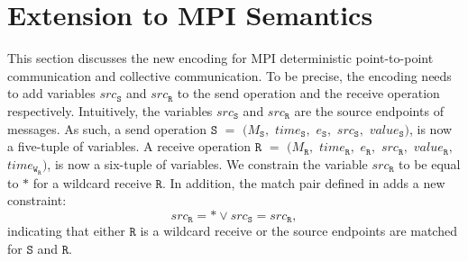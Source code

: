 \section{Extension to MPI Semantics}
This section discusses the new encoding for MPI deterministic point-to-point communication and collective communication. To be precise, the encoding needs to add variables  $src_\mathtt{S}$ and $src_\mathtt{R}$ to the send operation and the receive operation respectively. Intuitively, the variables $src_\mathtt{S}$ and $src_\mathtt{R}$ are the source endpoints of messages. As such, a send operation $\mathtt{S}$ $=$ $(M_\mathtt{S},$ $\mathit{time}_\mathtt{S},$ $e_\mathtt{S},$ $src_\mathtt{S},$ $\mathit{value}_\mathtt{S})$,  is now a five-tuple of variables. A receive operation $\mathtt{R}$ $=$ $(M_\mathtt{R},$ $\mathit{time}_\mathtt{R},$ $e_\mathtt{R},$ $src_\mathtt{R},$ $\mathit{value}_\mathtt{R},$ $\mathit{time}_{\mathtt{W}_\mathtt{R}})$, is now a six-tuple of variables. We constrain the variable $src_\mathtt{R}$ to be equal to $\ast$ for a wildcard receive $\mathtt{R}$. In addition, the match pair defined in  adds a new constraint: 
\[
src_\mathtt{R} = \ast \vee src_\mathtt{S} = src_\mathtt{R}, 
\]
indicating that either $\mathtt{R}$ is a wildcard receive or the source endpoints are matched for $\mathtt{S}$ and $\mathtt{R}$.
\\